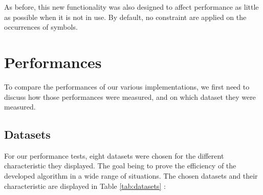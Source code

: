 \documentclass{eplmastersthesis}
\begin{document}
As before, this new functionality was also designed to affect performance as little as possible when it is not in use. By default, no constraint are applied on the occurrences of symbols.

\section{Performances}

To compare the performances of our various implementations, we first need to discuss how those performances were measured, and on which dataset they were measured.

\subsection{Datasets}

For our performance tests, eight datasets were chosen for the different characteristic they displayed. The goal being to prove the efficiency of the developed algorithm in a wide range of situations. The chosen datasets and their characteristic are displayed in Table \ref{tab:datasets} : \newline
\end{document}

